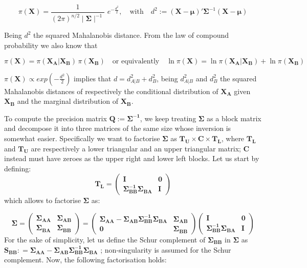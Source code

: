 \documentclass[openany]{book}
\begin{document}
$$ 
\pi(\mathbf{X}) = \frac{1}{(2 \pi)^{n/2} \mid \mathbf{\Sigma} \mid ^{-1}} \, \, e^{-\tfrac{d^2}{2}}, \quad \text{with} \quad  d^2 := (\mathbf{X} - \mathbf{\mu})' \mathbf{\Sigma}^{-1} (\mathbf{X} - \mathbf{\mu}) 
$$

Being $d^2$ the squared Mahalanobis distance. From the law of compound probability we also know that 
    
    $$\pi(\mathbf{X}) = \pi(\mathbf{X_A}|\mathbf{X_B}) \, \pi(\mathbf{X_B}) \quad \text{or equivalently} \quad \ln \pi(\mathbf{X}) = \ln \pi(\mathbf{X_A}|\mathbf{X_B}) + \ln \pi(\mathbf{X_B})$$ 


$\pi(\mathbf{X}) \propto exp(-\tfrac{d^2}{2})$ implies that $d = d^2_{A|B} + d^2_{B}$, being $d^2_{A|B}$ and $d^2_B$ the squared Mahalanobis distances of respectively the conditional distribution of $\mathbf{X_A}$ given $\mathbf{X_B}$ and the marginal distribution of $\mathbf{X_B}$.
  
 To compute the precision matrix $\mathbf{Q} := \mathbf{\Sigma^{-1}}$, we keep treating $\mathbf{\Sigma}$ as a block matrix and decompose it into three matrices of the same size whose inversion is somewhat easier. Specifically we want to factorise $\mathbf{\Sigma}$ as $\mathbf{T_U} \times \mathbf{C} \times \mathbf{T_L}$, where $\mathbf{T_L}$ and $\mathbf{T_U}$ are respectively a lower triangular and an upper triangular matrix; $\mathbf{C}$ instead must have zeroes as the upper right and lower left blocks. Let us start by defining:
 $$
  \mathbf{T_L} = \left( \begin{array}{ll} 
 	\mathbf{I} & \mathbf{0}\\ 
 	\mathbf{\Sigma_{BB}^{-1}} \mathbf{\Sigma_{BA}} & \mathbf{I}
 \end{array}
 \right)
$$ 
which allows to factorise $\mathbf{\Sigma}$ as:

$$
\mathbf{\Sigma} = \left( \begin{array}{ll} \mathbf{\Sigma_{AA}} & \mathbf{\Sigma_{AB}}
	\\ \mathbf{\Sigma_{BA}} & \mathbf{\Sigma_{BB}}  \end{array}
\right) = 
\left( \begin{array}{ll} \mathbf{\mathbf{\Sigma_{AA}} - \mathbf{\Sigma_{AB}} \mathbf{\Sigma^{-1}_{BB}} \mathbf{\Sigma_{BA}}} & \mathbf{\Sigma_{AB}}
	\\ \mathbf{0} & \mathbf{\Sigma_{BB}}  \end{array}
\right)
\left( \begin{array}{ll} 
	\mathbf{I} & \mathbf{0}\\ 
	\mathbf{\Sigma_{BB}^{-1}} \mathbf{\Sigma_{BA}} & \mathbf{I}
\end{array}
\right)
$$
For the sake of simplicity, let us define the Schur complement of $\mathbf{\Sigma_{BB}}$ in $\mathbf{\Sigma}$
\citep[][paragraph 0.7.3]{HornJohnson} as
$
\mathbf{S_{BB}} : =
\mathbf{\Sigma_{AA}} - \mathbf{\Sigma_{AB}} \mathbf{\Sigma^{-1}_{BB}} \mathbf{\Sigma_{BA}}
$
; non-singularity is assumed for the Schur complement. Now, the following factorisation holds:
\end{document}
